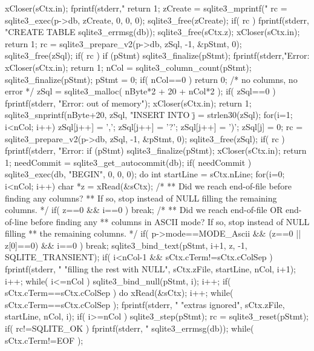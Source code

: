 \begin{Codex}[label=shell.c,numbers=left]
{{{{        xCloser(sCtx.in);
        fprintf(stderr,"%
        return 1;
      }
      zCreate = sqlite3_mprintf("%
      rc = sqlite3_exec(p->db, zCreate, 0, 0, 0);
      sqlite3_free(zCreate);
      if( rc ){
        fprintf(stderr, "CREATE TABLE %
                sqlite3_errmsg(db));
        sqlite3_free(sCtx.z);
        xCloser(sCtx.in);
        return 1;
      }
      rc = sqlite3_prepare_v2(p->db, zSql, -1, &pStmt, 0);
    }
    sqlite3_free(zSql);
    if( rc ){
      if (pStmt) sqlite3_finalize(pStmt);
      fprintf(stderr,"Error: %
      xCloser(sCtx.in);
      return 1;
    }
    nCol = sqlite3_column_count(pStmt);
    sqlite3_finalize(pStmt);
    pStmt = 0;
    if( nCol==0 ) return 0; /* no columns, no error */
    zSql = sqlite3_malloc( nByte*2 + 20 + nCol*2 );
    if( zSql==0 ){
      fprintf(stderr, "Error: out of memory\n");
      xCloser(sCtx.in);
      return 1;
    }
    sqlite3_snprintf(nByte+20, zSql, "INSERT INTO \"%
    j = strlen30(zSql);
    for(i=1; i<nCol; i++){
      zSql[j++] = ',';
      zSql[j++] = '?';
    }
    zSql[j++] = ')';
    zSql[j] = 0;
    rc = sqlite3_prepare_v2(p->db, zSql, -1, &pStmt, 0);
    sqlite3_free(zSql);
    if( rc ){
      fprintf(stderr, "Error: %
      if (pStmt) sqlite3_finalize(pStmt);
      xCloser(sCtx.in);
      return 1;
    }
    needCommit = sqlite3_get_autocommit(db);
    if( needCommit ) sqlite3_exec(db, "BEGIN", 0, 0, 0);
    do{
      int startLine = sCtx.nLine;
      for(i=0; i<nCol; i++){
        char *z = xRead(&sCtx);
        /*
        ** Did we reach end-of-file before finding any columns?
        ** If so, stop instead of NULL filling the remaining columns.
        */
        if( z==0 && i==0 ) break;
        /*
        ** Did we reach end-of-file OR end-of-line before finding any
        ** columns in ASCII mode?  If so, stop instead of NULL filling
        ** the remaining columns.
        */
        if( p->mode==MODE_Ascii && (z==0 || z[0]==0) && i==0 ) break;
        sqlite3_bind_text(pStmt, i+1, z, -1, SQLITE_TRANSIENT);
        if( i<nCol-1 && sCtx.cTerm!=sCtx.cColSep ){
          fprintf(stderr, "%
                          "filling the rest with NULL\n",
                          sCtx.zFile, startLine, nCol, i+1);
          i++;
          while( i<=nCol ){ sqlite3_bind_null(pStmt, i); i++; }
        }
      }
      if( sCtx.cTerm==sCtx.cColSep ){
        do{
          xRead(&sCtx);
          i++;
        }while( sCtx.cTerm==sCtx.cColSep );
        fprintf(stderr, "%
                        "extras ignored\n",
                        sCtx.zFile, startLine, nCol, i);
      }
      if( i>=nCol ){
        sqlite3_step(pStmt);
        rc = sqlite3_reset(pStmt);
        if( rc!=SQLITE_OK ){
          fprintf(stderr, "%
                  sqlite3_errmsg(db));
        }
      }
    }while( sCtx.cTerm!=EOF );

}}
\end{Codex}
